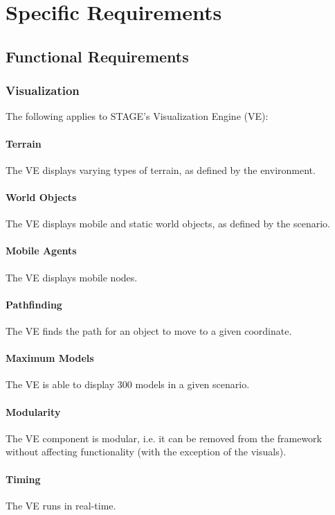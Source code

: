 \documentclass[titlepage]{article}
\begin{document}

\section{Specific Requirements%
  \label{specific-requirements}%
}

\subsection{Functional Requirements%
    \label{functional}%
}

\subsubsection{Visualization}
The following applies to STAGE's Visualization Engine (VE):
    \paragraph{Terrain} The VE displays varying types of terrain, as defined by the environment.
    \paragraph{World Objects} The VE displays mobile and static world objects, as defined by the scenario.
    \paragraph{Mobile Agents} The VE displays mobile nodes.
    \paragraph{Pathfinding} The VE finds the path for an object to move to a given coordinate.
    \paragraph{Maximum Models} The VE is able to display 300 models in a given scenario.
    \paragraph{Modularity} The VE component is modular, i.e. it can be removed from the framework without affecting functionality (with the exception of the visuals).
    \paragraph{Timing} The VE runs in real-time.
\end{document}
